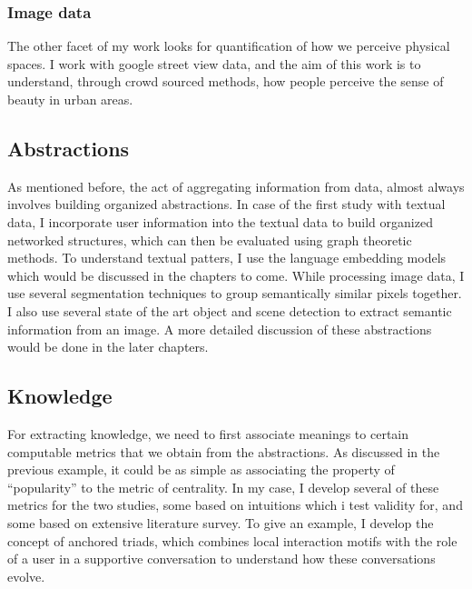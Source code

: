 \subsubsection{Image data}
The other facet of my work looks for quantification of how we perceive physical spaces. I work with google street view data, and the aim of this work is to understand, through crowd sourced methods, how people perceive the sense of beauty in urban areas. 

\subsection{Abstractions}
As mentioned before, the act of aggregating information from data, almost always involves building organized abstractions. In case of the first study with textual data, I incorporate user information into the textual data to build organized networked structures, which can then be evaluated using graph theoretic methods. To understand textual patters, I use the language embedding models which would be discussed in the chapters to come. 
While processing image data, I use several segmentation techniques to group semantically similar pixels together. I also use several state of the art object and scene detection to extract semantic information from an image. A more detailed discussion of these abstractions would be done in the later chapters.  

\subsection{Knowledge}
For extracting knowledge, we need to first associate meanings to certain computable metrics that we obtain from the abstractions. As discussed in the previous example, it could be as simple as associating the property of ``popularity'' to the metric of centrality. In my case, I develop several of these metrics for the two studies, some based on intuitions which i test validity for, and some based on extensive literature survey. To give an example, I develop the concept of anchored triads, which combines local interaction motifs with the role of a user in a supportive conversation to understand how these conversations evolve. 

